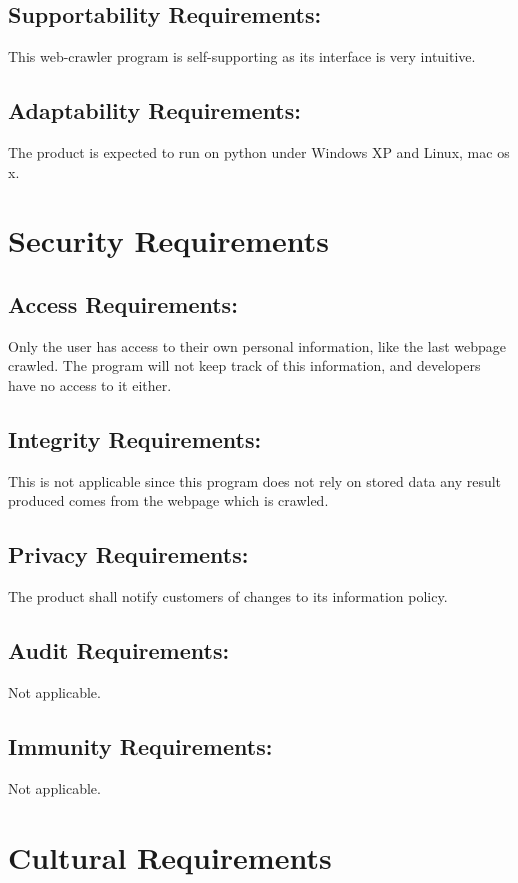 \documentclass[titlepage]{article}
\begin{document}
\subsection*{Supportability Requirements:}

This web-crawler program is self-supporting as its interface is very intuitive.

\subsection*{Adaptability Requirements:}

The product is expected to run on python under Windows XP and Linux, mac os x. 

\section{Security Requirements }

\subsection*{Access Requirements:}
Only the user has access to their own personal information, like the last webpage crawled. The program will not keep track of this information, and developers have no access to it either.

\subsection*{Integrity Requirements:}
This is not applicable since this program does not rely on stored data any result produced comes from the webpage which is crawled. 

\subsection*{Privacy Requirements:}
The product shall notify customers of changes to its information policy.

\subsection*{Audit Requirements:}
Not applicable.

\subsection*{Immunity Requirements:}
Not applicable.

\section{Cultural Requirements}
\end{document}
